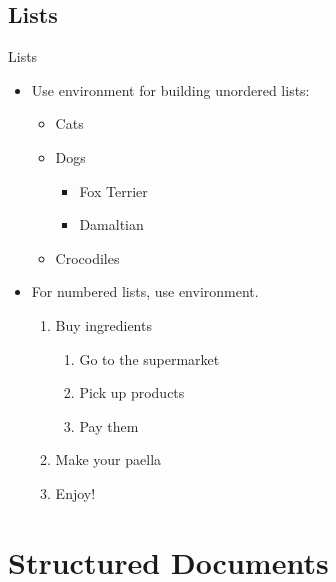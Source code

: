 \documentclass{beamer}
\begin{document}

\subsection*{Lists}
\begin{frame}[fragile]{Lists}
\begin{itemize}
\item Use  environment for building unordered lists:

\begin{exampletwouptiny}
\begin{itemize}
\item Cats
\item Dogs
  \begin{itemize}
    \item Fox Terrier
    \item Damaltian
  \end{itemize}
\item Crocodiles
\end{itemize}
\end{exampletwouptiny}

\item For numbered lists, use  environment.

\begin{exampletwouptiny}
\begin{enumerate}
\item Buy ingredients
  \begin{enumerate}
    \item Go to the supermarket
    \item Pick up products
    \item Pay them
  \end{enumerate}
\item Make your paella
\item Enjoy!
\end{enumerate}
\end{exampletwouptiny}

\end{itemize}

\end{frame}

\section{Structured Documents}
\end{document}
